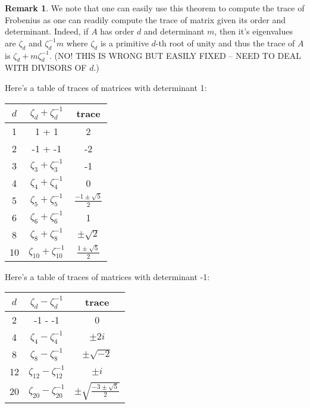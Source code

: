 \documentclass[11pt]{amsart}
\theoremstyle{plain}
\theoremstyle{definition}
\newtheorem{remark}[thm]{Remark}
\renewcommand{\[}{\left[}
\renewcommand{\]}{\right]}
\begin{document}
\begin{remark}
We note that one can easily use this theorem to compute the trace of Frobenius as one can readily compute the trace of matrix given its order and determinant.  Indeed, if $A$ has order $d$ and determinant $m$, then it's eigenvalues are $\zeta_d$ and $\zeta_d^{-1} m$ where $\zeta_d$ is a primitive $d$-th root of unity and thus the trace of $A$ is $\zeta_d + m \zeta_d^{-1}$.  (NO!  THIS IS WRONG BUT EASILY FIXED -- NEED TO DEAL WITH DIVISORS OF $d$.)

Here's a table of traces of matrices with determinant 1:

\begin{center}
\begin{tabular}{|c|c|c|}
\hline
$d $  & $\zeta_d + \zeta_d^{-1}$ & trace \\
\hline
1 & 1 + 1 & 2 \\
2 & -1 + -1 & -2  \\
3 & $\zeta_3 + \zeta_3^{-1}$ & -1  \\
4 & $\zeta_4 + \zeta_4^{-1}$ & 0 \\
5 & $\zeta_5 + \zeta_5^{-1}$  & $\frac{-1 \pm \sqrt{5}}{2}$ \\
6 & $\zeta_6 + \zeta_6^{-1}$  & 1 \\
8 & $\zeta_8 + \zeta_8^{-1}$  & $\pm \sqrt{2}$ \\
10 & $\zeta_{10} + \zeta_{10}^{-1}$  & $\frac{1 \pm \sqrt{5}}{2}$ \\
\hline
\end{tabular}
\end{center}

Here's a table of traces of matrices with determinant -1:

\begin{center}
\begin{tabular}{|c|c|c|}
\hline
$d $  & $\zeta_d - \zeta_d^{-1}$ & trace \\
\hline
2 & -1 - -1 & 0  \\
4 & $\zeta_4 - \zeta_4^{-1}$ &  $\pm 2 i$ \\
8 & $\zeta_8 - \zeta_8^{-1}$  & $\pm \sqrt{-2}$ \\
12 & $\zeta_{12} - \zeta_{12}^{-1}$  & $\pm i$ \\
20 & $\zeta_{20} - \zeta_{20}^{-1}$  & $\pm \sqrt{\frac{-3 \pm \sqrt{5}}{2}}$ \\
\hline
\end{tabular}
\end{center}

\end{remark}
\end{document}
